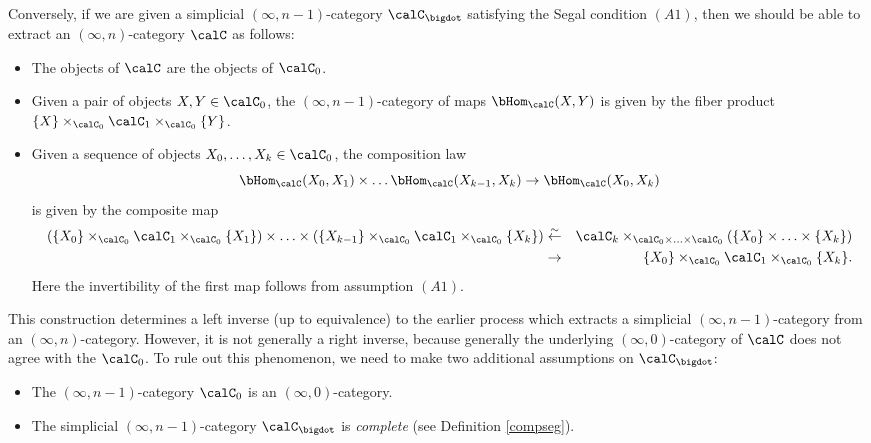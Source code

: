 Conversely, if we are given a simplicial $(\infty,n-1)$-category $\calC_{\bigdot}$ satisfying
the Segal condition $(A1)$, then we should be able to extract an $(\infty,n)$-category $\calC$
as follows:
\begin{itemize}
\item The objects of $\calC$ are the objects of $\calC_0$.
\item Given a pair of objects $X,Y \in \calC_0$, the $(\infty,n-1)$-category of maps
$\bHom_{\calC}(X,Y)$ is given by the fiber product
$\{X\} \times_{ \calC_0} \calC_1 \times_{\calC_0} \{Y\}$.
\item Given a sequence of objects $X_0, \ldots, X_k \in \calC_0$, the composition law
$$ \bHom_{\calC}(X_0, X_1) \times \ldots \bHom_{\calC}(X_{k-1}, X_k) \rightarrow \bHom_{\calC}(X_0, X_k)$$
is given by the composite map
\begin{align*} 
(\{X_0 \} \times_{\calC_0} \calC_1 \times_{\calC_0} \{X_1\})
\times \ldots \times ( \{X_{k-1}\} \times_{\calC_0} \calC_1 \times_{\calC_0} \{X_k\})
& \stackrel{\sim}{\leftarrow} & \calC_k \times_{ \calC_0 \times \ldots \times \calC_0 }
( \{X_0\} \times \ldots \times \{X_k\}) \\
& \rightarrow & \{X_0\} \times_{\calC_0} \calC_1 \times_{\calC_0} \{X_k\}. 
\end{align*}
Here the invertibility of the first map follows from assumption $(A1)$.
\end{itemize}
This construction determines a left inverse (up to equivalence) to the earlier
process which extracts a simplicial $(\infty,n-1)$-category from
an $(\infty,n)$-category. However, it is not generally a right inverse, because
generally the underlying $(\infty,0)$-category of $\calC$ does not agree with
the $\calC_0$. To rule out this phenomenon, we need to make two additional assumptions
on $\calC_{\bigdot}$: 
\begin{itemize}
\item[$(A2)$] The $(\infty,n-1)$-category $\calC_0$ is an $(\infty,0)$-category.
\item[$(A3)$] The simplicial $(\infty,n-1)$-category $\calC_{\bigdot}$ is {\it complete}
(see Definition \ref{compseg}). 
\end{itemize}

